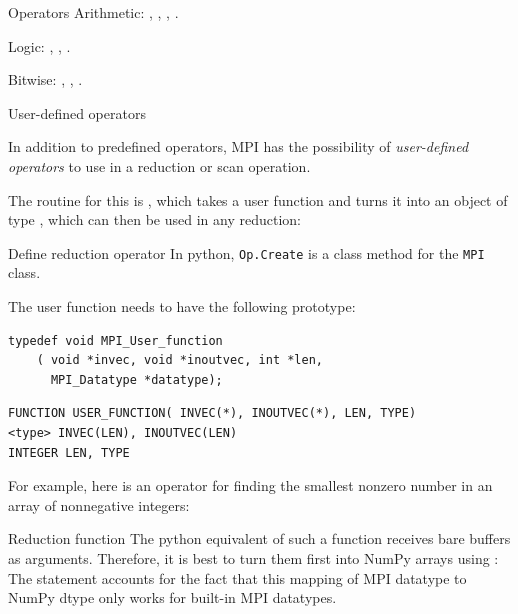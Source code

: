 \begin{mplnote}{Operators}
  Arithmetic: , , , .

  Logic: , , .

  Bitwise: , , .
\end{mplnote}

 {User-defined operators}
\label{sec:mpi-op-create}

In addition to predefined operators, MPI has the possibility of
\emph{user-defined operators}
to use in a reduction or scan operation.

The routine for this is ,
which takes a user function and turns it into
an object of type , which can then be
used in any reduction:
%

\begin{pythonnote}{Define reduction operator}
  In python, \lstinline+Op.Create+ is a class method for the \lstinline+MPI+ class.
\end{pythonnote}

The user function needs to have the following prototype:

\lstset{language=C}
\begin{lstlisting}
typedef void MPI_User_function
    ( void *invec, void *inoutvec, int *len, 
      MPI_Datatype *datatype); 
\end{lstlisting}

\lstset{language=Fortran}
\begin{lstlisting}
FUNCTION USER_FUNCTION( INVEC(*), INOUTVEC(*), LEN, TYPE) 
<type> INVEC(LEN), INOUTVEC(LEN) 
INTEGER LEN, TYPE 
\end{lstlisting}
\lstset{language=C}

For example, here is an operator for finding the smallest nonzero
number in an array of nonnegative integers:
%

\begin{pythonnote}{Reduction function}
  The python equivalent of such a function receives bare buffers as
  arguments. Therefore, it is best to turn them first into NumPy arrays
  using :
  The  statement accounts for the fact that this mapping of
  MPI datatype to NumPy dtype only works for built-in MPI datatypes.
\end{pythonnote}

